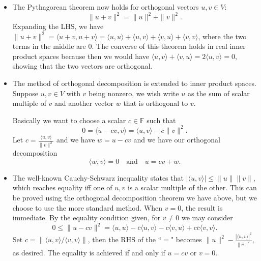 \documentclass{article}
\newcommand{\F}{\mathbb{F}}
\newcommand{\conj}[1]{\overline{#1}}
\newcommand{\inp}[2]{\langle #1, #2 \rangle}
\newcommand{\nm}[1]{\| #1 \|}
\begin{document}
\begin{itemize}
\begin{itemize}
        \item The Pythagorean theorem now holds for orthogonal vectors $u,v \in V$: $$\|u+v\|^2 = \|u\|^2 + \|v\|^2.$$ Expanding the LHS, we have $\|u+v\|^2 = \inp{u+v}{u+v} = \inp{u}{u} + \inp{u}{v} + \inp{v}{u} + \inp{v}{v}$, where the two terms in the middle are 0.
        The converse of this theorem holds in real inner product spaces because then we would have $\inp{u}{v}+\inp{v}{u} = 2\inp{u}{v} = 0$, showing that the two vectors are orthogonal.
        \item The method of orthogonal decomposition is extended to inner product spaces. Suppose $u,v \in V$ with $v$ being nonzero, we wish write $u$ as the sum of scalar multiple of $v$ and another vector $w$ that is orthogonal to $v$.
        
        Basically we want to choose a scalar $c \in \F$ such that $$0 = \inp{u-cv}{v} = \inp{u}{v} - c\|v\|^2.$$ Let $c = \frac{\inp{u}{v}}{\|v\|^2}$ and we have $w = u - cv$ and we have our orthogonal decomposition $$\inp{w}{v} = 0 \quad \text{and} \quad u = cv+w.$$
        \item The well-known Cauchy-Schwarz inequality states that $|\inp{u}{v}| \leq \|u\|\|v\|$, which reaches equality iff one of $u,v$ is a scalar multiple of the other. This can be proved using the orthogonal decomposition theorem we have above, but we choose to use the more standard method. When $v = 0$, the result is immediate. By the equality condition given, for $v \not= 0$ we may consider $$0 \leq \|u - cv\|^2 = \inp{u}{u} - \conj{c}\inp{u}{v} - c\inp{v}{u} + c\conj{c}\inp{v}{v}.$$ Set $c = \nm{\inp{u}{v}/\inp{v}{v}}$, then the RHS of the ``$=$" becomes $ \nm{u}^2 - \frac{|\inp{u}{v}|^2}{\nm{v}^2}$, as desired. The equality is achieved if and only if $u = cv$ or $v = 0$.
        

\end{itemize}
\end{itemize}
\end{document}
